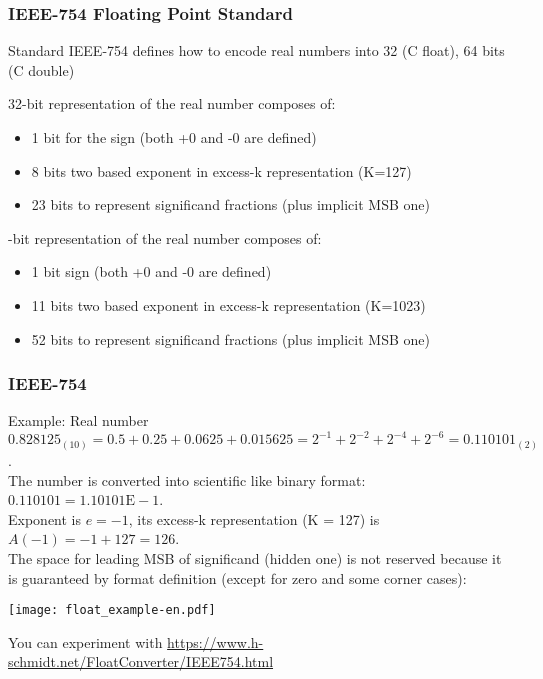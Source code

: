 \documentclass{beamer}
\begin{document}
\begin{frame}
\frametitle{IEEE-754 Floating Point Standard}

Standard IEEE-754 defines how to encode real numbers into 32 (C float), 64 bits (C double)

32-bit representation of the real number composes of:
\begin{itemize}
\item 1 bit for the sign (both +0 and -0 are defined)
\item 8 bits two based exponent in excess-k representation (K=127)
\item 23 bits to represent significand fractions (plus implicit MSB one)
\end{itemize}
-bit representation of the real number composes of:
\begin{itemize}
\item 1 bit sign (both +0 and -0 are defined)
\item 11 bits two based exponent in excess-k representation (K=1023)
\item 52 bits to represent significand fractions (plus implicit MSB one)
\end{itemize}

\end{frame}


\begin{frame}
\frametitle{IEEE-754}

Example:
Real number $0.828125_{(10)} = 0.5+0.25+0.0625+0.015625=2^{-1}+2^{-2}+2^{-4}+2^{-6} = 0.110101_{(2)}$.\\
The number is converted into scientific like binary format: $0.110101 = 1.10101\text{E}-1$.\\
Exponent is $e=-1$, its excess-k representation (K = 127) is $A(-1)=-1+127 = 126$.\\
The space for leading MSB of significand (hidden one)
is not reserved because it is guaranteed by format definition (except for zero and some corner cases):

\begin{center}
\texttt{[image: float\_example-en.pdf]}
\end{center}

You can experiment with \url{https://www.h-schmidt.net/FloatConverter/IEEE754.html}
\end{frame}
\end{document}
